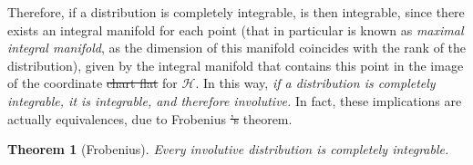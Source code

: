 \documentclass[12pt, letterpaper, reqno]{amsart}
\theoremstyle{definition}
\theoremstyle{plain}
\newtheorem{thm}{Theorem}
\theoremstyle{remark}
\providecommand{\DIFadd}[1]{{\protect\color{blue}\uwave{#1}}} %
\providecommand{\DIFdel}[1]{{\protect\color{red}\sout{#1}}}                      %
\providecommand{\DIFaddbegin}{} %
\providecommand{\DIFaddend}{} %
\providecommand{\DIFdelbegin}{} %
\providecommand{\DIFdelend}{} %
\newcommand{\DIFscaledelfig}{0.5}
\newlength{\DIFdelgraphicswidth} %
\newlength{\DIFdelgraphicsheight} %
\newcommand{\DIFaddincludegraphics}[2][]{{\color{blue}\fbox{\DIFOincludegraphics[#1]{#2}}}} %
\newcommand{\DIFdelincludegraphics}[2][]{%
\sbox{\DIFdelgraphicsbox}{\DIFOincludegraphics[#1]{#2}}%
\settoboxwidth{\DIFdelgraphicswidth}{\DIFdelgraphicsbox} %
\settoboxtotalheight{\DIFdelgraphicsheight}{\DIFdelgraphicsbox} %
\scalebox{\DIFscaledelfig}{%
\parbox[b]{\DIFdelgraphicswidth}{\usebox{\DIFdelgraphicsbox}\\[-\baselineskip] \rule{\DIFdelgraphicswidth}{0em}}\llap{\resizebox{\DIFdelgraphicswidth}{\DIFdelgraphicsheight}{%
\setlength{\unitlength}{\DIFdelgraphicswidth}%
\begin{picture}(1,1)%
\thicklines\linethickness{2pt} %
{\color[rgb]{1,0,0}\put(0,0){\framebox(1,1){}}}%
{\color[rgb]{1,0,0}\put(0,0){\line( 1,1){1}}}%
{\color[rgb]{1,0,0}\put(0,1){\line(1,-1){1}}}%
\end{picture}%
}\hspace*{3pt}}} %
} %
\DeclareRobustCommand{\DIFaddbegin}{\DIFOaddbegin \let\includegraphics\DIFaddincludegraphics} %
\DeclareRobustCommand{\DIFaddend}{\DIFOaddend \let\includegraphics\DIFOincludegraphics} %
\DeclareRobustCommand{\DIFdelbegin}{\DIFOdelbegin \let\includegraphics\DIFdelincludegraphics} %
\DeclareRobustCommand{\DIFdelend}{\DIFOaddend \let\includegraphics\DIFOincludegraphics} %
\begin{document}
Therefore, if a distribution is completely integrable, is then integrable, since there exists an integral manifold for each point (that in particular is known as \textit{maximal integral manifold}, as the dimension of this manifold coincides with the rank of the distribution), given by the integral manifold that contains this point in the image of the coordinate \DIFdelbegin \DIFdel{chart flat }\DIFdelend \DIFaddbegin \DIFadd{flat chart }\DIFaddend for $ \mathcal{H}. $ In this way, \textit{ if a distribution is completely integrable, it is integrable, and therefore involutive.} In fact, these implications are actually equivalences, due to Frobenius \DIFdelbegin \DIFdel{'s }\DIFdelend theorem.

\begin{thm}[Frobenius]
	Every involutive distribution is completely integrable.	
\end{thm}
\end{document}
